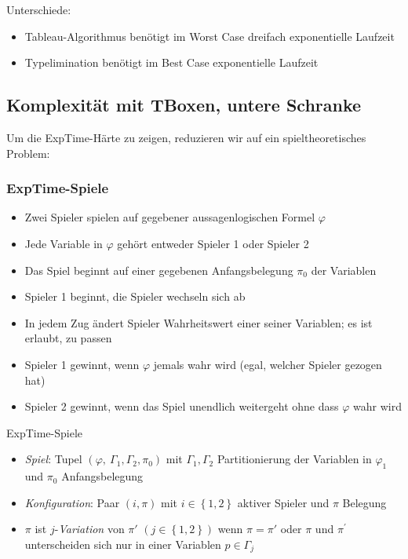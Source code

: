 Unterschiede:

\begin{itemize}
  \item Tableau-Algorithmus benötigt im Worst Case dreifach exponentielle Laufzeit
  \item Typelimination benötigt im Best Case exponentielle Laufzeit
\end{itemize}

\subsection{Komplexität mit TBoxen, untere Schranke}\label{komplexituxe4t-mit-tboxen-untere-schranke}

Um die ExpTime-Härte zu zeigen, reduzieren wir auf ein spieltheoretisches Problem:

\subsubsection{ExpTime-Spiele}\label{exptime-spiele}

\begin{itemize}
\item
  Zwei Spieler spielen auf gegebener aussagenlogischen Formel
  $\varphi$
\item
  Jede Variable in $\varphi$ gehört entweder Spieler 1 oder Spieler 2
\item
  Das Spiel beginnt auf einer gegebenen Anfangsbelegung $\pi_{0}$ der
  Variablen
\item
  Spieler 1 beginnt, die Spieler wechseln sich ab
\item
  In jedem Zug ändert Spieler Wahrheitswert einer seiner Variablen; es
  ist erlaubt, zu passen
\item
  Spieler 1 gewinnt, wenn $\varphi$ jemals wahr wird (egal, welcher
  Spieler gezogen hat)
\item
  Spieler 2 gewinnt, wenn das Spiel unendlich weitergeht ohne dass
  $\varphi$ wahr wird
\end{itemize}

\begin{definition}{ExpTime-Spiele}

\begin{itemize}
\item
  \emph{Spiel}: Tupel
  $\left( \varphi,\ \Gamma_{1},\Gamma_{2},\pi_{0} \right)$ mit
  $\Gamma_{1},\Gamma_{2}$ Partitionierung der Variablen in
  $\varphi_{1}$ und $\pi_{0}$ Anfangsbelegung
\item
  \emph{Konfiguration}: Paar $(i,\pi)$ mit
  $i \in \left\{ 1,2 \right\}$ aktiver Spieler und $\pi$ Belegung
\item
  $\pi$ ist $j$-\emph{Variation} von $\pi'$
  $\left( j \in \left\{ 1,2 \right\} \right)$ wenn $\pi = \pi'$ oder
  $\pi$ und $\pi^{'}$ unterscheiden sich nur in einer Variablen
  $p \in \Gamma_{j}$
\end{itemize}
\end{definition}

